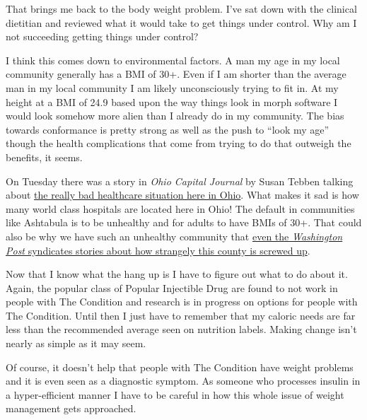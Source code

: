 That brings me back to the body weight problem. I've sat down with the
clinical dietitian and reviewed what it would take to get things under
control. Why am I not succeeding getting things under control?

I think this comes down to environmental factors. A man my age in my
local community generally has a BMI of 30+. Even if I am shorter than
the average man in my local community I am likely unconsciously trying
to fit in. At my height at a BMI of 24.9 based upon the way things look
in morph software I would look somehow more alien than I already do in
my community. The bias towards conformance is pretty strong as well as
the push to ``look my age'' though the health complications that come
from trying to do that outweigh the benefits, it seems.

On Tuesday there was a story in \emph{Ohio Capital Journal} by Susan
Tebben talking about
\href{https://web.archive.org/web/20240416114129/https://ohiocapitaljournal.com/2024/04/16/mental-health-care-costs-top-problems-for-ohioans-in-new-study/}{the
really bad healthcare situation here in Ohio}. What makes it sad is how
many world class hospitals are located here in Ohio! The default in
communities like Ashtabula is to be unhealthy and for adults to have
BMIs of 30+. That could also be why we have such an unhealthy community
that
\href{https://web.archive.org/web/20240105093608/https://www.unionleader.com/news/health/how-red-state-politics-are-shaving-years-off-american-lives/article_a15969c1-6959-526b-91d2-9d1c966c15fd.html}{even
the \emph{Washington Post} syndicates stories about how strangely this
county is screwed up}.

Now that I know what the hang up is I have to figure out what to do
about it. Again, the popular class of Popular Injectible Drug are found
to not work in people with The Condition and research is in progress on
options for people with The Condition. Until then I just have to
remember that my caloric needs are far less than the recommended average
seen on nutrition labels. Making change isn't nearly as simple as it may
seem.

Of course, it doesn't help that people with The Condition have weight
problems and it is even seen as a diagnostic symptom. As someone who
processes insulin in a hyper-efficient manner I have to be careful in
how this whole issue of weight management gets approached.
